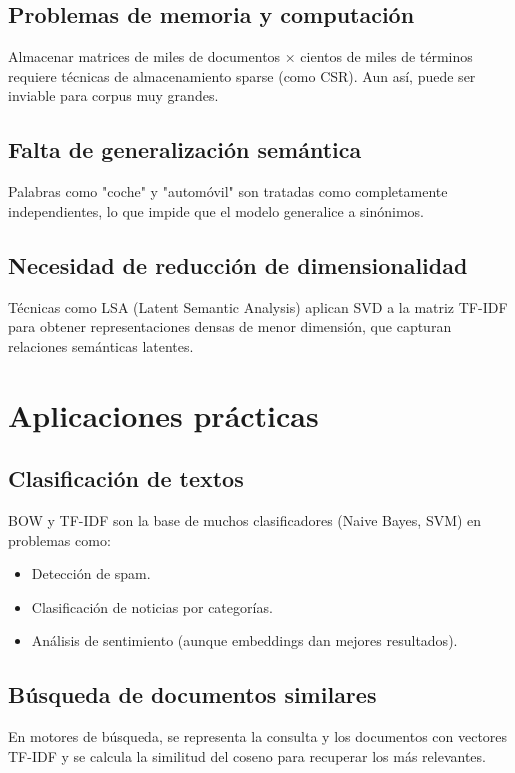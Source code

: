\documentclass[12pt,a4paper,openany,oneside]{book}
\begin{document}
\subsection{Problemas de memoria y computación}
Almacenar matrices de miles de documentos × cientos de miles de términos requiere técnicas de almacenamiento sparse (como CSR). Aun así, puede ser inviable para corpus muy grandes.

\subsection{Falta de generalización semántica}
Palabras como "coche" y "automóvil" son tratadas como completamente independientes, lo que impide que el modelo generalice a sinónimos.

\subsection{Necesidad de reducción de dimensionalidad}
Técnicas como LSA (Latent Semantic Analysis) aplican SVD a la matriz TF-IDF para obtener representaciones densas de menor dimensión, que capturan relaciones semánticas latentes.

\section{Aplicaciones prácticas}

\subsection{Clasificación de textos}
BOW y TF-IDF son la base de muchos clasificadores (Naive Bayes, SVM) en problemas como:
\begin{itemize}
    \item Detección de spam.
    \item Clasificación de noticias por categorías.
    \item Análisis de sentimiento (aunque embeddings dan mejores resultados).
\end{itemize}

\subsection{Búsqueda de documentos similares}
En motores de búsqueda, se representa la consulta y los documentos con vectores TF-IDF y se calcula la similitud del coseno para recuperar los más relevantes.
\end{document}

